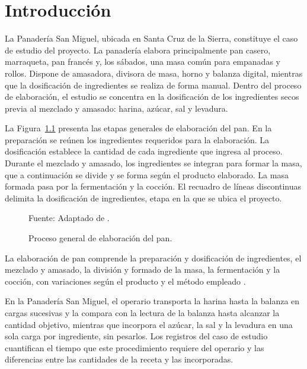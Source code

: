 \raggedbottom

\chapter{Introducción}
\label{sec:introduction}

La Panadería San Miguel, ubicada en Santa Cruz de la Sierra, constituye
el caso de estudio del proyecto. La panadería elabora principalmente pan
casero, marraqueta, pan francés y, los sábados, una masa común para
empanadas y rollos. Dispone de amasadora, divisora de masa, horno y balanza
digital, mientras que la dosificación de ingredientes se realiza de forma
manual. Dentro del proceso de elaboración, el estudio se concentra en la
dosificación de los ingredientes secos previa al mezclado y amasado:
harina, azúcar, sal y levadura.


La Figura~\ref{fig:proceso_general_pan} presenta las etapas generales de
elaboración del pan. En la preparación se reúnen los ingredientes requeridos
para la elaboración. La dosificación establece la cantidad de cada ingrediente
que ingresa al proceso. Durante el mezclado y amasado, los ingredientes se
integran para formar la masa, que a continuación se divide y se forma según
el producto elaborado. La masa formada pasa por la fermentación y la
cocción. El recuadro de líneas discontinuas delimita la dosificación de
ingredientes, etapa en la que se ubica el proyecto.

\begin{figure}[H]
    \centering

    \resizebox{0.95\textwidth}{!}{%
        {\setlength{\fboxsep}{10pt}
        \fbox{%
            
        }}
    }

    \caption{Proceso general de elaboración del pan.}
    \label{fig:proceso_general_pan}

    \vspace{0.2em}
    {\footnotesize Fuente: Adaptado de \textcite{lim2019spc}.}

\end{figure}

La elaboración de pan comprende la preparación y dosificación de
ingredientes, el mezclado y amasado, la división y formado de la masa,
la fermentación y la cocción, con variaciones según el producto y el
método empleado \parencite{cauvain2015technology}.

En la Panadería San Miguel, el operario transporta la harina hasta la
balanza en cargas sucesivas y la compara con la lectura de la balanza hasta
alcanzar la cantidad objetivo, mientras que incorpora el azúcar, la sal y
la levadura en una sola carga por ingrediente, sin pesarlos. Los registros
del caso de estudio cuantifican el tiempo que este procedimiento requiere
del operario y las diferencias entre las cantidades de la receta y las
incorporadas.

